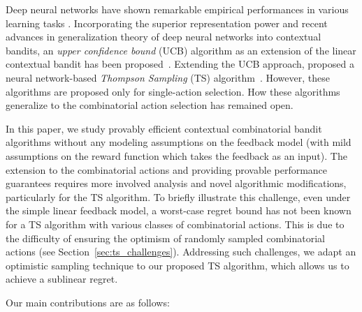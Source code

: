 \documentclass{article}
\theoremstyle{plain}
\begin{document}
Deep neural networks have shown remarkable empirical performances in various learning tasks \cite{lecun2015deep, goodfellow2016deep, silver2016mastering}. 
Incorporating the superior representation power and recent advances in generalization theory of deep neural networks \cite{jacot2018ntk,cao2019generalization} into contextual bandits, 
an {\it upper confidence bound} (UCB) algorithm as an extension of the linear contextual bandit has been proposed~\cite{zhou2020neural}.
Extending the UCB approach, \citet{zhang2021neural} proposed a neural network-based  {\it Thompson Sampling} (TS) algorithm~\cite{thompson1933likelihood}.
However, these algorithms are proposed only for single-action selection.
How these algorithms generalize to the combinatorial action selection has remained open.

In this paper, we study provably efficient contextual combinatorial bandit algorithms without any modeling assumptions on the feedback model (with mild assumptions on the reward function which takes the feedback as an input). The extension to the combinatorial actions and providing provable performance guarantees requires more involved analysis and novel algorithmic modifications, particularly for the TS algorithm.
To briefly illustrate this challenge, even under the simple linear feedback model, a worst-case regret bound has not been known for a TS algorithm with various classes of combinatorial actions. This is due to the difficulty of ensuring the optimism of randomly sampled combinatorial actions (see Section~\ref{sec:ts_challenges}). Addressing such challenges, we adapt an optimistic sampling technique to our proposed TS algorithm, which allows us to achieve a sublinear regret.

Our main contributions are as follows:
\end{document}

